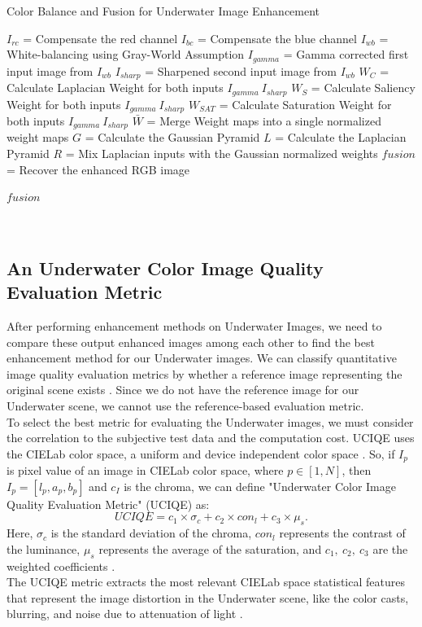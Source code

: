 \documentclass[a4paper,11pt,oneside]{article}
\begin{document}
  \begin{algorithm}
	\caption*{Color Balance and Fusion for Underwater Image Enhancement \cite{26}}
	\begin{algorithmic}

    \State $I_{rc}$ = Compensate the red channel
    \State $I_{bc}$ = Compensate the blue channel
    \State $I_{wb}$ = White-balancing using Gray-World Assumption
    \State $I_{gamma}$ = Gamma corrected first input image from $I_{wb}$
    \State $I_{sharp}$ = Sharpened second input image from $I_{wb}$
    \State
    \State $W_C$ = Calculate Laplacian Weight for both inputs $I_{gamma} \: I_{sharp}$
    \State $W_S$ = Calculate Saliency Weight for both inputs $I_{gamma} \: I_{sharp}$
    \State $W_{SAT}$ = Calculate Saturation Weight for both inputs $I_{gamma} \: I_{sharp}$
    \State $\bar W$ = Merge Weight maps into a single normalized weight maps
    \State
    \State $G$ = Calculate the Gaussian Pyramid
    \State $L$ = Calculate the Laplacian Pyramid
    \State
    \State $R$ = Mix Laplacian inputs with the Gaussian normalized weights
    \State
    \State $fusion$ = Recover the enhanced RGB image
    
    \Return $fusion$
\EndProcedure

\end{algorithmic}
\end{algorithm}\\
\subsection{An Underwater Color Image Quality Evaluation Metric \cite{18}}
After performing enhancement methods on Underwater Images, we need to compare these output enhanced images among each other to find the best enhancement method for our Underwater images. We can classify quantitative image quality evaluation metrics by whether a reference image representing the original scene exists \cite{18}. Since we do not have the reference image for our Underwater scene, we cannot use the reference-based evaluation metric.\\
To select the best metric for evaluating the Underwater images, we must consider the correlation to the subjective test data and the computation cost. UCIQE uses the CIELab color space, a uniform and device independent color space \cite{18}. So, if $I_p$ is pixel value of an image in CIELab color space, where $p \in [1,N]$, then $I_p = [l_p, a_p, b_p]$ and $c_I$ is the chroma, we can define "Underwater Color Image Quality Evaluation Metric" (UCIQE) \cite{18} as:
$$UCIQE = c_1 \times \sigma_c + c_2 \times con_l + c_3 \times \mu_s.$$
Here, $\sigma_c$ is the standard deviation of the chroma, $con_l$ represents the contrast of the luminance, $\mu_s$ represents the average of the saturation, and $c_1, \: c_2, \: c_3$ are the weighted coefficients \cite{18}. \\
The UCIQE metric extracts the most relevant CIELab space statistical features that represent the image distortion in the Underwater scene, like the color casts, blurring, and noise due to attenuation of light \cite{18}. 
\end{document}
